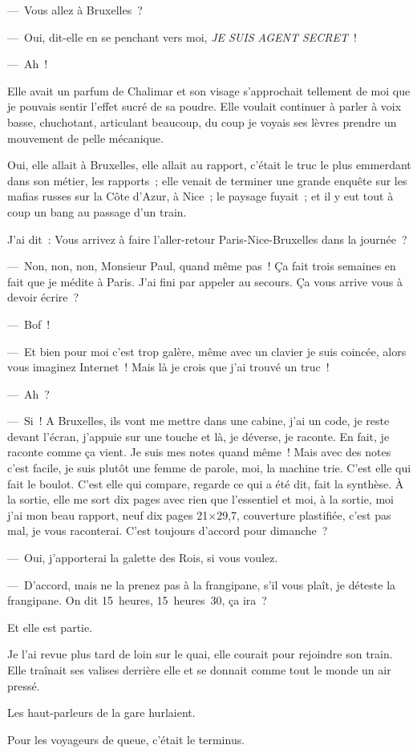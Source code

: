 \documentclass[french,twoside]{book} %
\begin{document}
— Vous allez à Bruxelles ?\par
— Oui, dit-elle en se penchant vers moi, \emph{JE SUIS AGENT SECRET} !\par
— Ah !\par
Elle avait un parfum de Chalimar et son visage s’approchait tellement de moi que je pouvais sentir l’effet sucré de sa poudre. Elle voulait continuer à parler à voix basse, chuchotant, articulant beaucoup, du coup je voyais ses lèvres prendre un mouvement de pelle mécanique.\par
Oui, elle allait à Bruxelles, elle allait au rapport, c’était le truc le plus emmerdant dans son métier, les rapports ; elle venait de terminer une grande enquête sur les mafias russes sur la Côte d’Azur, à Nice ; le paysage fuyait ; et il y eut tout à coup un bang au passage d’un train.\par
J’ai dit : Vous arrivez à faire l’aller-retour Paris-Nice-Bruxelles dans la journée ?\par
— Non, non, non, Monsieur Paul, quand même pas ! Ça fait trois semaines en fait que je médite à Paris. J’ai fini par appeler au secours. Ça vous arrive vous à devoir écrire ?\par
— Bof !\par
— Et bien pour moi c’est trop galère, même avec un clavier je suis coincée, alors vous imaginez Internet ! Mais là je crois que j’ai trouvé un truc !\par
— Ah ?\par
— Si ! A Bruxelles, ils vont me mettre dans une cabine, j’ai un code, je reste devant l’écran, j’appuie sur une touche et là, je déverse, je raconte. En fait, je raconte comme ça vient. Je suis mes notes quand même ! Mais avec des notes c’est facile, je suis plutôt une femme de parole, moi, la machine trie. C’est elle qui fait le boulot. C’est elle qui compare, regarde ce qui a été dit, fait la synthèse. À la sortie, elle me sort dix pages avec rien que l’essentiel et moi, à la sortie, moi j’ai mon beau rapport, neuf dix pages 21×29,7, couverture plastifiée, c’est pas mal, je vous raconterai. C’est toujours d’accord pour dimanche ?\par
— Oui, j’apporterai la galette des Rois, si vous voulez.\par
— D’accord, mais ne la prenez pas à la frangipane, s’il vous plaît, je déteste la frangipane. On dit 15 heures, 15 heures 30, ça ira ?\par
Et elle est partie.\par
Je l’ai revue plus tard de loin sur le quai, elle courait pour rejoindre son train. Elle traînait ses valises derrière elle et se donnait comme tout le monde un air pressé.\par
Les haut-parleurs de la gare hurlaient.\par
Pour les voyageurs de queue, c’était le terminus.
\end{document}
